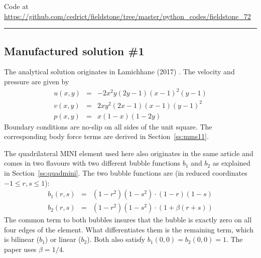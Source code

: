

\begin{center}
Code at \url{https://github.com/cedrict/fieldstone/tree/master/python_codes/fieldstone_72}
\end{center}

\par\noindent\rule{\textwidth}{0.4pt}



\subsection*{Manufactured solution \#1}

The analytical solution originates in Lamichhane (2017) \cite{lami17}.
The velocity and pressure are given by
\begin{eqnarray}
u(x,y)&=&-2x^2y(2y-1)(x-1)^2(y-1) \\
v(x,y)&=& 2xy^2(2x-1)(x-1)(y-1)^2 \\
p(x,y)&=& x(1-x)(1-2y)
\end{eqnarray}
Boundary conditions are no-slip on all sides of the unit square. 
The corresponding body force terms are derived in Section~\ref{ss:mms11}. 


The quadrilateral MINI element used here also originates in the same article 
and comes in two flavours with two different bubble functions $b_1$ and $b_2$
as explained in Section~\ref{ss:quadmini}.
The two bubble functions are (in reduced coordinates $-1 \leq r,s \leq 1$):
\begin{eqnarray}
b_1(r,s) &=& (1-r^2)(1-s^2)\cdot (1-r)(1-s)\\
b_2(r,s) &=& (1-r^2)(1-s^2)\cdot (1+\beta(r+s))
\end{eqnarray}
The common term to both bubbles insures that the bubble is exactly zero on all four edges of the 
element. What differentiates them is the remaining term, which is bilinear ($b_1$) or linear ($b_2$). 
Both also satisfy $b_1(0,0)=b_2(0,0)=1$. The paper uses $\beta=1/4$.

